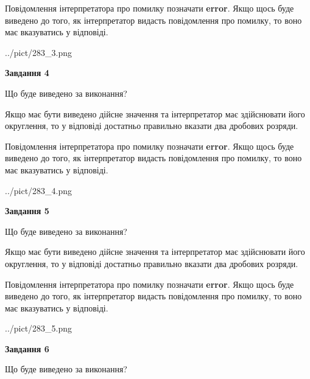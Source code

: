 \documentclass[12pt, ukrainian]{article}
\begin{document}
{\begin {Large}
Повідомлення інтерпретатора про помилку позначати \textbf{error}.
Якщо щось буде виведено до того, як інтерпретатор видасть повідомлення про помилку, 
то воно має вказуватись у відповіді. \par

\begin{center}
	{../pict/283_3.png}
\end{center}
\newpage

{\begin {center}\textbf{Завдання 4}\end {center}}\par
Що буде виведено за виконання? \par

Якщо має бути виведено дійсне значення та інтерпретатор має здійснювати його округлення, 
то у відповіді достатньо правильно вказати два дробових розряди.

Повідомлення інтерпретатора про помилку позначати \textbf{error}.
Якщо щось буде виведено до того, як інтерпретатор видасть повідомлення про помилку, 
то воно має вказуватись у відповіді. \par

\begin{center}
	{../pict/283_4.png}
\end{center}
\newpage

{\begin {center}\textbf{Завдання 5}\end {center}}\par
Що буде виведено за виконання? \par

Якщо має бути виведено дійсне значення та інтерпретатор має здійснювати його округлення, 
то у відповіді достатньо правильно вказати два дробових розряди.

Повідомлення інтерпретатора про помилку позначати \textbf{error}.
Якщо щось буде виведено до того, як інтерпретатор видасть повідомлення про помилку, 
то воно має вказуватись у відповіді. \par

\begin{center}
	{../pict/283_5.png}
\end{center}
\newpage

{\begin {center}\textbf{Завдання 6}\end {center}}\par
Що буде виведено за виконання? \par


\end{Large}}
\end{document}
